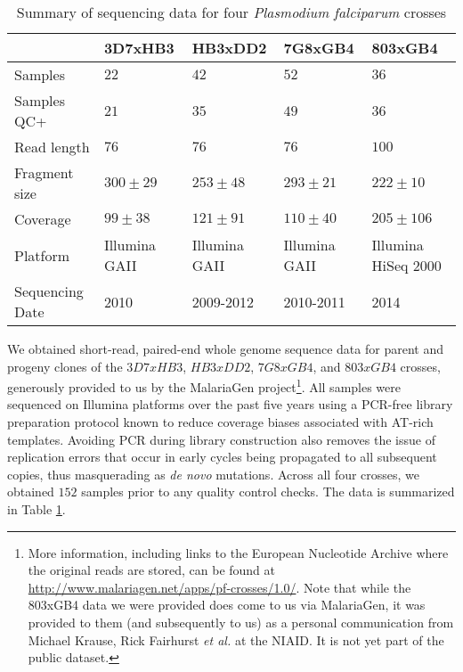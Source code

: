 \begin{table}[]
\centering
\caption{Summary of sequencing data for four \textit{Plasmodium falciparum} crosses}
\label{tbl:crosssummary}
\begin{tabular}{@{}lllll@{}}
\toprule
                & 3D7xHB3       & HB3xDD2       & 7G8xGB4       & 803xGB4             \\ \midrule
Samples         & $22$          & $42$          & $52$          & $36$                \\
Samples QC+     & $21$          & $35$          & $49$          & $36$                \\
Read length     & $76$          & $76$          & $76$          & $100$               \\
Fragment size   & $300 \pm 29$  & $253 \pm 48$  & $293 \pm 21$  & $222 \pm 10$        \\
Coverage        & $99  \pm 38$  & $121 \pm 91$  & $110 \pm 40$  & $205 \pm 106$       \\
Platform        & Illumina GAII & Illumina GAII & Illumina GAII & Illumina HiSeq 2000 \\
Sequencing Date & 2010          & 2009-2012     & 2010-2011     & 2014                \\ \bottomrule
\end{tabular}
\end{table}

We obtained short-read, paired-end whole genome sequence data for parent and progeny clones of the $3D7xHB3$\cite{Walliker:1987cv}, $HB3xDD2$\cite{Wellems:1990eg}, $7G8xGB4$\cite{Hayton:2008hn}, and $803xGB4$ crosses, generously provided to us by the MalariaGen project\footnote{More information, including links to the European Nucleotide Archive where the original reads are stored, can be found at \url{http://www.malariagen.net/apps/pf-crosses/1.0/}.  Note that while the 803xGB4 data we were provided does come to us via MalariaGen, it was provided to them (and subsequently to us) as a personal communication from Michael Krause, Rick Fairhurst \textit{et al.} at the NIAID.  It is not yet part of the public dataset.}.  All samples were sequenced on Illumina platforms over the past five years using a PCR-free library preparation protocol known to reduce coverage biases associated with AT-rich templates.  Avoiding PCR during library construction also removes the issue of replication errors that occur in early cycles being propagated to all subsequent copies, thus masquerading as \textit{de novo} mutations.  Across all four crosses, we obtained $152$ samples prior to any quality control checks.  The data is summarized in Table \ref{tbl:crosssummary}.

